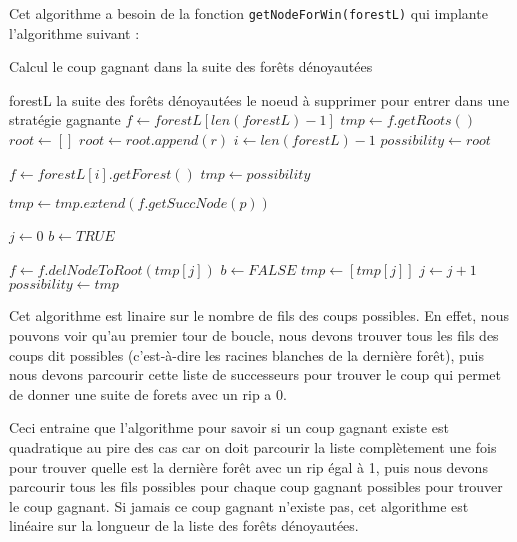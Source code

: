 Cet algorithme a besoin de la fonction \texttt{getNodeForWin(forestL)} qui implante l'algorithme suivant :
\clearpage
\begin{algorithm}[hbt]
  \caption{Calcul le coup gagnant dans la suite des forêts dénoyautées}
  \begin{algorithmic}
    \REQUIRE forestL la suite des forêts dénoyautées
    \ENSURE le noeud à supprimer pour entrer dans une stratégie gagnante
    \STATE $f \leftarrow forestL[len(forestL) - 1]$
    \STATE $tmp \leftarrow f.getRoots()$
    \STATE $root \leftarrow []$
          \STATE $root \leftarrow root.append(r)$
        \ENDIF
    \ENDFOR
    \STATE $i \leftarrow len(forestL) - 1$
    \STATE $possibility \leftarrow root$

      \STATE $f \leftarrow forestL[i].getForest()$
      \STATE $tmp \leftarrow possibility$

        \STATE $tmp \leftarrow tmp.extend(f.getSuccNode(p))$
      \ENDFOR

      \STATE $j \leftarrow 0$
      \STATE $b \leftarrow TRUE$

        \STATE $f \leftarrow f.delNodeToRoot(tmp[j])$
          \STATE $b \leftarrow FALSE$
          \STATE $tmp \leftarrow [tmp[j]]$
        \ENDIF
        \STATE $j \leftarrow j + 1$
      \ENDWHILE
      \STATE $possibility \leftarrow tmp$
    \ENDWHILE
  \end{algorithmic}
\end{algorithm}
Cet algorithme est linaire sur le nombre de fils des coups possibles. En effet, nous pouvons voir qu'au premier tour de boucle, nous devons trouver tous les fils des coups dit possibles (c'est-à-dire les racines blanches de la dernière forêt), puis nous devons parcourir cette liste de successeurs pour trouver le coup qui permet de donner une suite de forets avec un rip a 0.

Ceci entraine que l'algorithme pour savoir si un coup gagnant existe est quadratique au pire des cas car on doit parcourir la liste complètement une fois pour trouver quelle est la dernière forêt avec un rip égal à 1, puis nous devons parcourir tous les fils possibles pour chaque coup gagnant possibles pour trouver le coup gagnant. Si jamais ce coup gagnant n'existe pas, cet algorithme est linéaire sur la longueur de la liste des forêts dénoyautées.

